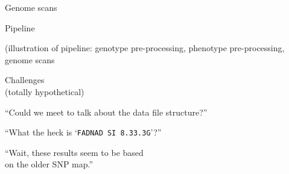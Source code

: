 \documentclass[aspectratio=169,12pt,t]{beamer}
\begin{document}
\begin{frame}[c]{Genome scans}




\end{frame}




\begin{frame}[c]{Pipeline}


(illustration of pipeline: genotype pre-processing, phenotype
  pre-processing, genome scans


\end{frame}



\begin{frame}[c]{}


\begin{center}
\Large
  {\color{title} Challenges} \\[24pt]
  {\lolit \large (totally hypothetical)}
\end{center}

\end{frame}





\begin{frame}[c]{}

\begin{center}
  \Large

  ``Could we meet to talk about the data file structure?'' \\[36pt]
\end{center}

\end{frame}



\begin{frame}[c]{}

\begin{center}
  \Large


``What the heck is `{\hilit \tt FAD{\textunderscore}NAD SI 8.3{\textunderscore}3.3G}'?''

\end{center}

\end{frame}





\begin{frame}[c]{}

\begin{center}
  \Large


  ``Wait, these results seem to be based \\
  on the older SNP map.''

\end{center}

\end{frame}
\end{document}
